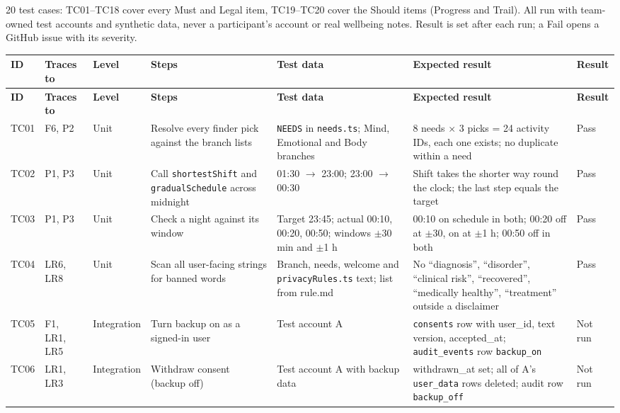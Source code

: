 \documentclass{article}
\begin{document}
20 test cases: TC01--TC18 cover every Must and Legal item, TC19--TC20 cover the Should items (Progress and Trail). All run with team-owned test accounts and synthetic data, never a participant's account or real wellbeing notes. Result is set after each run; a Fail opens a GitHub issue with its severity.

{\small
\setlength{\tabcolsep}{4pt}
\begin{longtable}{|L{0.95cm}|L{1.35cm}|L{1.55cm}|L{3.0cm}|L{2.75cm}|L{3.85cm}|L{1.1cm}|}
\hline
\textbf{ID} & \textbf{Traces to} & \textbf{Level} & \textbf{Steps} & \textbf{Test data} & \textbf{Expected result} & \textbf{Result} \\ \hline
\endfirsthead
\hline
\textbf{ID} & \textbf{Traces to} & \textbf{Level} & \textbf{Steps} & \textbf{Test data} & \textbf{Expected result} & \textbf{Result} \\ \hline
\endhead
TC01 & F6, P2 & Unit & Resolve every finder pick against the branch lists & \texttt{NEEDS} in \texttt{needs.ts}; Mind, Emotional and Body branches & 8 needs $\times$ 3 picks = 24 activity IDs, each one exists; no duplicate within a need & Pass \\ \hline
TC02 & P1, P3 & Unit & Call \texttt{shortestShift} and \texttt{gradualSchedule} across midnight & 01:30 $\rightarrow$ 23:00; 23:00 $\rightarrow$ 00:30 & Shift takes the shorter way round the clock; the last step equals the target & Pass \\ \hline
TC03 & P1, P3 & Unit & Check a night against its window & Target 23:45; actual 00:10, 00:20, 00:50; windows $\pm$30 min and $\pm$1 h & 00:10 on schedule in both; 00:20 off at $\pm$30, on at $\pm$1 h; 00:50 off in both & Pass \\ \hline
TC04 & LR6, LR8 & Unit & Scan all user-facing strings for banned words & Branch, needs, welcome and \texttt{privacyRules.ts} text; list from rule.md & No ``diagnosis'', ``disorder'', ``clinical risk'', ``recovered'', ``medically healthy'', ``treatment'' outside a disclaimer & Pass \\ \hline
TC05 & F1, LR1, LR5 & Integration & Turn backup on as a signed-in user & Test account A & \texttt{consents} row with user\_id, text version, accepted\_at; \texttt{audit\_events} row \texttt{backup\_on} & Not run \\ \hline
TC06 & LR1, LR3 & Integration & Withdraw consent (backup off) & Test account A with backup data & withdrawn\_at set; all of A's \texttt{user\_data} rows deleted; audit row \texttt{backup\_off} & Not run \\ \hline

\end{longtable}}
\end{document}

